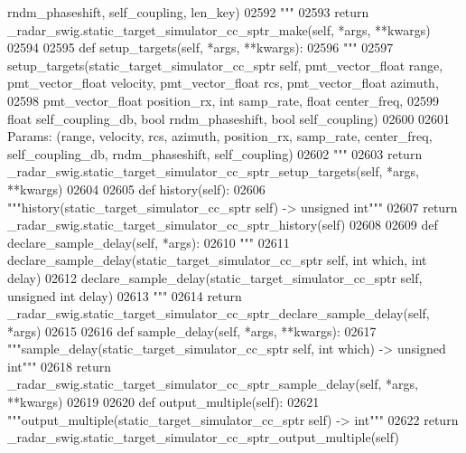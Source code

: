 \begin{DoxyCode}
{{{{{{{{{{{       rndm\_phaseshift, self\_coupling, len\_key)}
02592 \textcolor{stringliteral}{        """}
02593         \textcolor{keywordflow}{return} \_radar\_swig.static\_target\_simulator\_cc\_sptr\_make(self, *args, **kwargs)
02594 
02595     \textcolor{keyword}{def }setup_targets(self, *args, **kwargs):
02596         \textcolor{stringliteral}{"""}
02597 \textcolor{stringliteral}{        setup\_targets(static\_target\_simulator\_cc\_sptr self, pmt\_vector\_float range, pmt\_vector\_float
       velocity, pmt\_vector\_float rcs, pmt\_vector\_float azimuth, }
02598 \textcolor{stringliteral}{            pmt\_vector\_float position\_rx, int samp\_rate, float center\_freq, }
02599 \textcolor{stringliteral}{            float self\_coupling\_db, bool rndm\_phaseshift, bool self\_coupling)}
02600 \textcolor{stringliteral}{}
02601 \textcolor{stringliteral}{        Params: (range, velocity, rcs, azimuth, position\_rx, samp\_rate, center\_freq, self\_coupling\_db,
       rndm\_phaseshift, self\_coupling)}
02602 \textcolor{stringliteral}{        """}
02603         \textcolor{keywordflow}{return} \_radar\_swig.static\_target\_simulator\_cc\_sptr\_setup\_targets(self, *args, **kwargs)
02604 
02605     \textcolor{keyword}{def }history(self):
02606         \textcolor{stringliteral}{"""history(static\_target\_simulator\_cc\_sptr self) -> unsigned int"""}
02607         \textcolor{keywordflow}{return} \_radar\_swig.static\_target\_simulator\_cc\_sptr\_history(self)
02608 
02609     \textcolor{keyword}{def }declare_sample_delay(self, *args):
02610         \textcolor{stringliteral}{"""}
02611 \textcolor{stringliteral}{        declare\_sample\_delay(static\_target\_simulator\_cc\_sptr self, int which, int delay)}
02612 \textcolor{stringliteral}{        declare\_sample\_delay(static\_target\_simulator\_cc\_sptr self, unsigned int delay)}
02613 \textcolor{stringliteral}{        """}
02614         \textcolor{keywordflow}{return} \_radar\_swig.static\_target\_simulator\_cc\_sptr\_declare\_sample\_delay(self, *args)
02615 
02616     \textcolor{keyword}{def }sample_delay(self, *args, **kwargs):
02617         \textcolor{stringliteral}{"""sample\_delay(static\_target\_simulator\_cc\_sptr self, int which) -> unsigned int"""}
02618         \textcolor{keywordflow}{return} \_radar\_swig.static\_target\_simulator\_cc\_sptr\_sample\_delay(self, *args, **kwargs)
02619 
02620     \textcolor{keyword}{def }output_multiple(self):
02621         \textcolor{stringliteral}{"""output\_multiple(static\_target\_simulator\_cc\_sptr self) -> int"""}
02622         \textcolor{keywordflow}{return} \_radar\_swig.static\_target\_simulator\_cc\_sptr\_output\_multiple(self)
}}}}}}}}}}
\end{DoxyCode}

